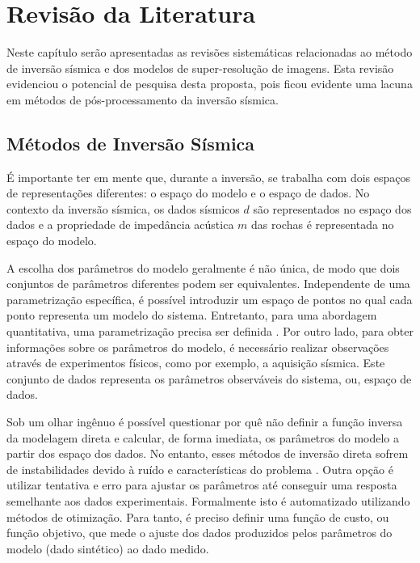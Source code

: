 \chapter{Revisão da Literatura}
\label{cap:3revisaoliteraria}

Neste capítulo serão apresentadas as revisões sistemáticas relacionadas
ao método de inversão sísmica e dos modelos de super-resolução de imagens.
Esta revisão evidenciou o potencial de pesquisa desta proposta, pois
ficou evidente uma lacuna em métodos de pós-processamento da inversão sísmica.

\section{Métodos de Inversão Sísmica}
É importante ter em mente que, durante a inversão, se trabalha com dois espaços
de representações diferentes: o espaço do modelo e o espaço de dados.
No contexto da inversão sísmica, os dados sísmicos $d$ são representados no espaço
dos dados e a propriedade de impedância acústica $m$ das rochas é representada
no espaço do modelo.

A escolha dos parâmetros do modelo geralmente é não única, de modo que dois conjuntos
de parâmetros diferentes podem ser equivalentes. Independente de uma parametrização
específica, é possível introduzir um espaço de pontos no qual cada ponto representa um modelo
do sistema. Entretanto, para uma abordagem quantitativa, uma parametrização precisa ser definida \cite{tarantola}.
Por outro lado, para obter informações sobre os parâmetros do modelo, é necessário
realizar observações através de experimentos físicos, como por exemplo, a
aquisição sísmica. Este conjunto de dados representa os parâmetros observáveis do sistema,
ou, espaço de dados.

Sob um olhar ingênuo é possível questionar por quê não definir a
função inversa da modelagem direta e calcular, de forma imediata,
os parâmetros do modelo a partir dos espaço dos dados.
No entanto, esses métodos de inversão direta sofrem de instabilidades
devido à ruído e características do problema \citep[p. 50]{sen_livro}. Outra
opção é utilizar tentativa e erro para ajustar os parâmetros até conseguir uma
resposta semelhante aos dados experimentais. Formalmente isto é automatizado
utilizando métodos de otimização. Para tanto, é preciso definir uma função de
custo, ou função objetivo, que mede o ajuste dos dados produzidos pelos
parâmetros do modelo (dado sintético) ao dado medido.
% 

